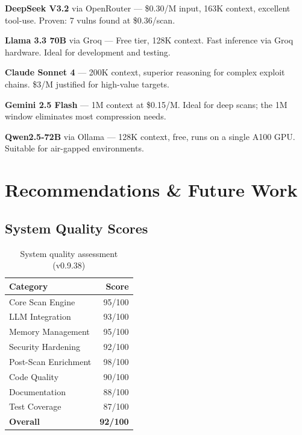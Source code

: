 \documentclass[11pt,a4paper]{article}
\begin{document}
\begin{tipbox}
\textbf{DeepSeek V3.2} via OpenRouter --- \$0.30/M input, 163K context, excellent
tool-use. Proven: 7 vulns found at \$0.36/scan.
\end{tipbox}

\begin{tipbox}
\textbf{Llama 3.3 70B} via Groq --- Free tier, 128K context. Fast inference via
Groq hardware. Ideal for development and testing.
\end{tipbox}

\begin{tipbox}
\textbf{Claude Sonnet 4} --- 200K context, superior reasoning for complex exploit
chains. \$3/M justified for high-value targets.
\end{tipbox}

\begin{tipbox}
\textbf{Gemini 2.5 Flash} --- 1M context at \$0.15/M. Ideal for deep scans; the
1M window eliminates most compression needs.
\end{tipbox}

\begin{tipbox}
\textbf{Qwen2.5-72B} via Ollama --- 128K context, free, runs on a single A100
GPU. Suitable for air-gapped environments.
\end{tipbox}


\section{Recommendations \& Future Work}
\label{sec:recommendations}

\subsection{System Quality Scores}
\begin{table}[H]
\centering
\caption{System quality assessment (v0.9.38)}
\label{tab:scores}
\begin{tabular}{lr}
\toprule
\textbf{Category} & \textbf{Score} \\
\midrule
Core Scan Engine        & 95/100 \\
LLM Integration         & 93/100 \\
Memory Management       & 95/100 \\
Security Hardening      & 92/100 \\
Post-Scan Enrichment    & 98/100 \\
Code Quality            & 90/100 \\
Documentation           & 88/100 \\
Test Coverage           & 87/100 \\
\midrule
\textbf{Overall}        & \textbf{92/100} \\
\bottomrule
\end{tabular}
\end{table}
\end{document}
